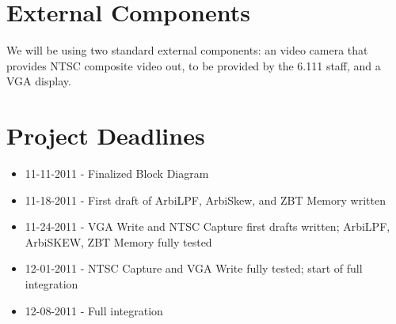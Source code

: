 \documentclass[10pt]{article}
\begin{document}
\section{External Components}
We will be using two standard external components: an video camera that provides NTSC composite video out, to be provided by the 6.111 staff, and a VGA display.

\section{Project Deadlines}
\begin{itemize}
\item 11-11-2011 - Finalized Block Diagram
\item 11-18-2011 - First draft of ArbiLPF, ArbiSkew, and ZBT Memory written
\item 11-24-2011 - VGA Write and NTSC Capture first drafts written; ArbiLPF, ArbiSKEW, ZBT Memory fully tested
\item 12-01-2011 - NTSC Capture and VGA Write fully tested; start of full integration
\item 12-08-2011 - Full integration
\end{itemize}
\end{document}
